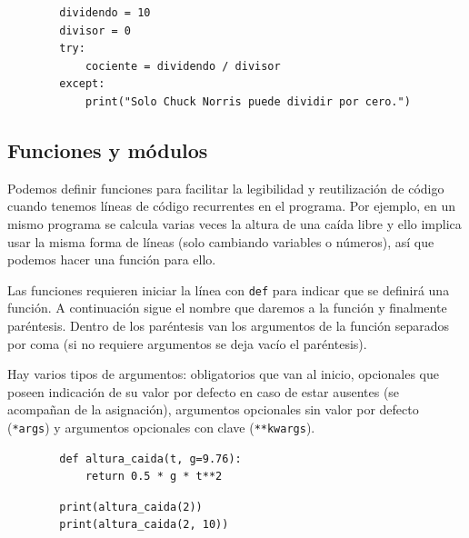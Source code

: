 \begin{listing}[H]
    \begin{verbatim}
        dividendo = 10
        divisor = 0
        try:
            cociente = dividendo / divisor
        except:
            print("Solo Chuck Norris puede dividir por cero.")
    \end{verbatim}
\end{listing}


\subsection{Funciones y módulos}

Podemos definir funciones para facilitar la legibilidad y reutilización
de código cuando tenemos líneas de código recurrentes en el programa.
Por ejemplo, en un mismo programa se calcula varias veces la altura de
una caída libre y ello implica usar la misma forma de líneas (solo
cambiando variables o números), así que podemos hacer una función para
ello.

Las funciones requieren iniciar la línea con \texttt{def} para indicar
que se definirá una función. A continuación sigue el nombre que daremos
a la función y finalmente paréntesis. Dentro de los paréntesis van los
argumentos de la función separados por coma (si no requiere argumentos
se deja vacío el paréntesis).

Hay varios tipos de argumentos: obligatorios que van al inicio,
opcionales que poseen indicación de su valor por defecto en caso de
estar ausentes (se acompañan de la asignación), argumentos opcionales
sin valor por defecto (\texttt{*args}) y argumentos opcionales con clave
(\texttt{**kwargs}).

\begin{listing}[H]
    \begin{verbatim}
        def altura_caida(t, g=9.76): 
            return 0.5 * g * t**2
    \end{verbatim}
\end{listing}

\begin{listing}[H]
    \begin{verbatim}
        print(altura_caida(2)) 
        print(altura_caida(2, 10)) 
    \end{verbatim}
\end{listing}


